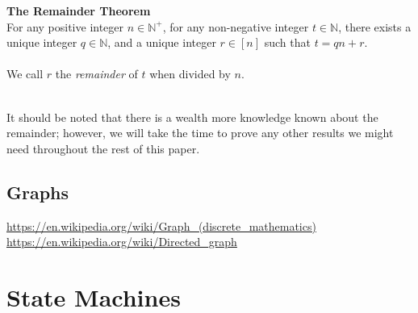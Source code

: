 \documentclass[a4paper,12pt]{article}
\begin{document}
\begin{tcolorbox}
\textbf{\hypertarget{theorem:remainder}{The Remainder Theorem}}\\
For any positive integer $n \in \mathbb{N^{+}}$, for any non-negative integer $t \in \mathbb{N}$, there exists a unique integer $q \in \mathbb{N}$, and a unique integer $r \in [n]$ such that $t = qn + r$.\\
\\
We call $r$ the \textit{remainder} of $t$ when divided by $n$.
\end{tcolorbox}
\label{theorem:remainder}
\hypertarget{theorem:remainder}{}
\noindent
\\
It should be noted that there is a wealth more knowledge known about the remainder; however, we will take the time to prove any other results we might need throughout the rest of this paper.




\subsection{Graphs}
\url{https://en.wikipedia.org/wiki/Graph_(discrete_mathematics)}\\
\url{https://en.wikipedia.org/wiki/Directed_graph}





\section{State Machines}
\label{section:state_machines}
\end{document}
